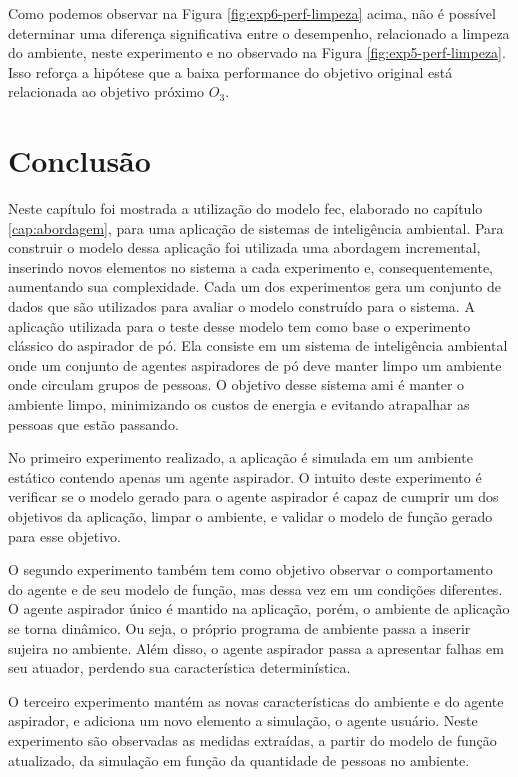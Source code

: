 Como podemos observar na Figura \ref{fig:exp6-perf-limpeza} acima, não é possível determinar uma diferença significativa entre o desempenho, relacionado a limpeza do ambiente, neste experimento e no observado na Figura \ref{fig:exp5-perf-limpeza}. Isso reforça a hipótese que a baixa performance do objetivo original está relacionada ao objetivo próximo $O_3$.

\section{Conclusão}
\label{sec:conclusao}

Neste capítulo foi mostrada a utilização do modelo \acrshort{fec}, elaborado no capítulo \ref{cap:abordagem}, para uma aplicação de sistemas de inteligência ambiental. Para construir o modelo dessa aplicação foi utilizada uma abordagem incremental, inserindo novos elementos no sistema a cada experimento e, consequentemente, aumentando sua complexidade. Cada um dos experimentos gera um conjunto de dados que são utilizados para avaliar o modelo construído para o sistema. 
A aplicação utilizada para o teste desse modelo tem como base o experimento clássico do aspirador de pó. Ela consiste em um sistema de inteligência ambiental onde um conjunto de agentes aspiradores de pó deve manter limpo um ambiente onde circulam grupos de pessoas. O objetivo desse sistema \acrshort{ami} é manter o ambiente limpo, minimizando os custos de energia e evitando atrapalhar as pessoas que estão passando.

No primeiro experimento realizado, a aplicação é simulada em um ambiente estático contendo apenas um agente aspirador. O intuito deste experimento é verificar se o modelo gerado para o agente aspirador é capaz de cumprir um dos objetivos da aplicação, limpar o ambiente, e validar o modelo de função gerado para esse objetivo. 

O segundo experimento também tem como objetivo observar o comportamento do agente e de seu modelo de função, mas dessa vez em um condições diferentes. O agente aspirador único é mantido na aplicação, porém, o ambiente de aplicação se torna dinâmico. Ou seja, o próprio programa de ambiente passa a inserir sujeira no ambiente. Além disso, o agente aspirador passa a apresentar falhas em seu atuador, perdendo sua característica determinística.

O terceiro experimento mantém as novas características do ambiente e do agente aspirador, e adiciona um novo elemento a simulação, o agente usuário. Neste experimento são observadas as medidas extraídas, a partir do modelo de função atualizado, da simulação em função da quantidade de pessoas no ambiente.

